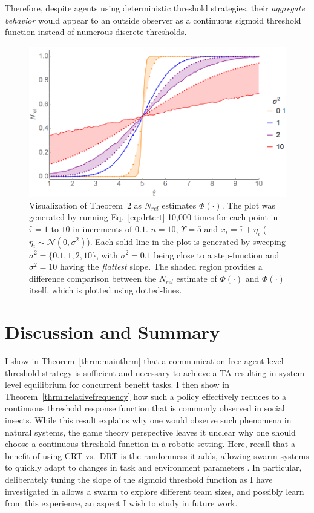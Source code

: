 \documentclass[12pt]{book}
\newcommand{\td}{\Upsilon}   %
\begin{document}
Therefore, despite agents using deterministic threshold strategies, their \emph{aggregate behavior} would appear to an outside observer as a continuous sigmoid threshold function instead of numerous discrete thresholds.
\begin{figure}[!ht]
	\centering\includegraphics[width=0.6\columnwidth]{../assets/thm2fig.png}
	\centering\caption{Visualization of Theorem~2 as $N_{rel}$ estimates $\Phi(\cdot)$. The plot was generated by running Eq.~\ref{eq:drtcrt} 10,000 times for each point in $\hat{\tau} = 1$ to $10$ in increments of $0.1$. $n = 10$, $\td = 5$ and $x_i = \hat{\tau} + \eta_i$ ($\eta_i \sim\mathcal{N}(0, \sigma^2)$). Each solid-line in the plot is generated by sweeping $\sigma^2 = \{0.1, 1, 2, 10\}$, with $\sigma^2 = 0.1$ being close to a step-function and $\sigma^2 = 10$ having the \emph{flattest} slope. The shaded region provides a difference comparison between the $N_{rel}$ estimate of $\Phi(\cdot)$ and $\Phi(\cdot)$ itself, which is plotted using dotted-lines.}\label{fig:thm2fig}
\end{figure}

\section{Discussion and Summary}\label{sec:discsum}
I show in Theorem~\ref{thrm:mainthrm} that a communication-free agent-level threshold strategy is sufficient and necessary to achieve a TA resulting in system-level equilibrium for concurrent benefit tasks. I then show in Theorem~\ref{thrm:relativefrequency} how such a policy effectively reduces to a continuous threshold response function that is commonly observed in social insects. While this result explains why one would observe such phenomena in natural systems, the game theory perspective leaves it unclear why one should choose a continuous threshold function in a robotic setting. Here, recall that a benefit of using CRT vs.~DRT is the randomness it adds, allowing swarm systems to quickly adapt to changes in task and environment parameters \cite{Bonabeau1997}. In particular, deliberately tuning the slope of the sigmoid threshold function as I have investigated in \cite{Kanakia2014} allows a swarm to explore different team sizes, and possibly learn from this experience, an aspect I wish to study in future work.
\end{document}
